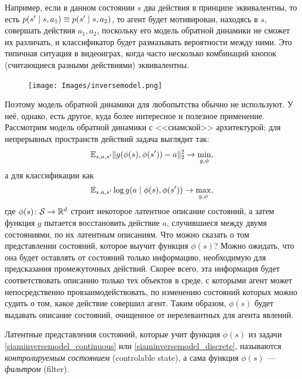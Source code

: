 \begin{example}
Например, если в данном состоянии $s$ два действия в принципе эквивалентны, то есть $p(s' \HM\mid s, a_1) \HM\equiv p(s' \HM\mid s, a_2)$, то агент будет мотивирован, находясь в $s$, совершать действия $a_1, a_2$, поскольку его модель обратной динамики не сможет их различать, и классификатор будет размазывать вероятности между ними. Это типичная ситуация в видеоиграх, когда часто несколько комбинаций кнопок (считающиеся разными действиями) эквивалентны.
\end{example}

\begin{figure}
\centering
\texttt{[image: Images/inversemodel.png]}
\vspace{-0.4cm}
\end{figure}

Поэтому модель обратной динамики для любопытства обычно не используют. У неё, однако, есть другое, куда более интересное и полезное применение. Рассмотрим модель обратной динамики с <<сиамской>> архитектурой; для непрерывных пространств действий задача выглядит так:
\begin{equation}\label{siaminversemodel_continuous}
\mathbb{E}_{s, a, s'} \|g(\phi(s), \phi(s')) - a\|^2_2 \to \min_{g, \phi},
\end{equation}
а для классификации как
\begin{equation}\label{siaminversemodel_discrete}
\mathbb{E}_{s, a, s'} \log g(a \mid \phi(s), \phi(s')) \to \max_{g, \phi},
\end{equation}
где $\phi(s) \colon \mathcal{S} \to \mathbb{R}^d$ строит некоторое латентное описание состояний, а затем функция $g$ пытается восстановить действие $a$, случившиеся между двумя состояниями, по их латентным описаниям. Что можно сказать о том представлении состояний, которое выучит функция $\phi(s)$? Можно ожидать, что она будет оставлять от состояний только информацию, необходимую для предсказания промежуточных действий. Скорее всего, эта информация будет соответствовать описанию только тех объектов в среде, с которыми агент может непосредственно провзаимодействовать, по изменению состояний которых можно судить о том, какое действие совершил агент. Таким образом, $\phi(s)$ будет выдавать описание состояний, очищенное от нерелевантных для агента явлений.

\begin{definition}
Латентные представления состояний, которые учит функция $\phi(s)$ из задачи \eqref{siaminversemodel_continuous} или \eqref{siaminversemodel_discrete}, называются \emph{контролируемым состоянием} (controlable state), а сама функция $\phi(s)$ --- \emph{фильтром} (filter).
\end{definition}

